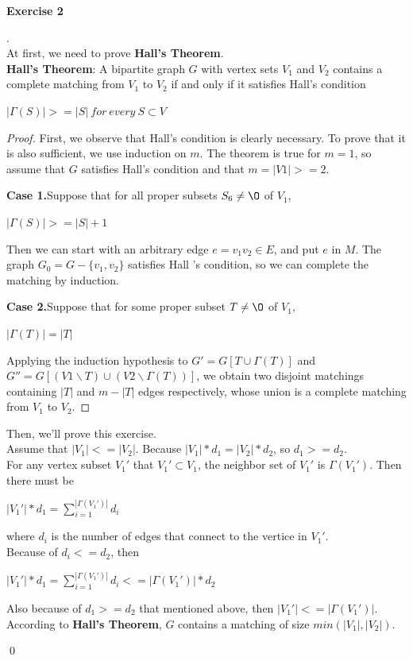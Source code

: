 \documentclass[12pt, notitlepage]{article}
\newenvironment{sol}
  {\par\vspace{3mm}\noindent{\it Solution}.}{\qed}
\begin{document}
\textbf{Exercise 2}
\begin{sol}\\
At first, we need to prove \textbf{Hall's Theorem}.\\
\textbf{Hall's Theorem}: A bipartite graph $G$ with vertex sets $V_1$ and $V_2$ contains a complete matching
from $V_1$ to $V_2$ if and only if it satisfies Hall's condition\\
\centerline{$|\Gamma (S)| >= |S|\ for\ every\ S \subset V$}
\begin{proof}
First, we observe that Hall’s condition is clearly necessary. To prove that it is also sufficient, we use induction on $m$. The theorem is true for $m = 1$, so assume that $G$ satisfies Hall’s condition and that $m = |V1| >= 2$.

\qquad \textbf{Case 1.}Suppose that for all proper subsets $S _6 \neq \O$ of $V_1$,\\
\centerline{$|\Gamma(S)| >= |S| + 1$}
Then we can start with an arbitrary edge $e = v_1v_2 \in E$, and put $e$ in $M$. The graph $G_0 = G- \{v_1, v_2\}$ satisfies Hall ’s condition, so we can complete the matching by induction.

\qquad \textbf{Case 2.}Suppose that for some proper subset $T \neq \O$ of $V_1$,\\
\centerline{$|\Gamma (T)| = |T|$}
Applying the induction hypothesis to $G' = G[T \cup \Gamma (T)]$ and $G'' = G[(V1 \backslash T) \cup (V2 \backslash \Gamma (T))]$, we obtain two disjoint matchings containing $|T|$ and $m-|T|$ edges respectively, whose union is a complete matching from $V_1$ to $V_2$.
\end{proof}

Then, we'll prove this exercise.\\
Assume that $|V_1| <= |V_2|$. Because $|V_1|*d_1 = |V_2|*d_2$, so $d_1 >= d_2$.\\
For any vertex subset $V_1'$ that $V_1'\subset V_1$, the neighbor set of $V_1'$ is $\Gamma (V_1')$. Then there must be
\centerline{$|V_1'|*d_1 = \sum\limits^{|\Gamma (V_1')|}_{i=1}d_i$}
where $d_i$ is the number of edges that connect to the vertice in $V_1'$.\\
Because of $d_i <= d_2$, then\\
\centerline{$|V_1'|*d_1 = \sum\limits^{|\Gamma (V_1')|}_{i=1}d_i <= |\Gamma (V_1')| * d_2$}
Also because of $d_1 >= d_2$ that mentioned above, then $|V_1'| <= |\Gamma (V_1')|$.\\
According to \textbf{Hall's Theorem},  $G$ contains a matching of size $min(|V_1|, |V_2|)$.

\end{sol}
\end{document}
